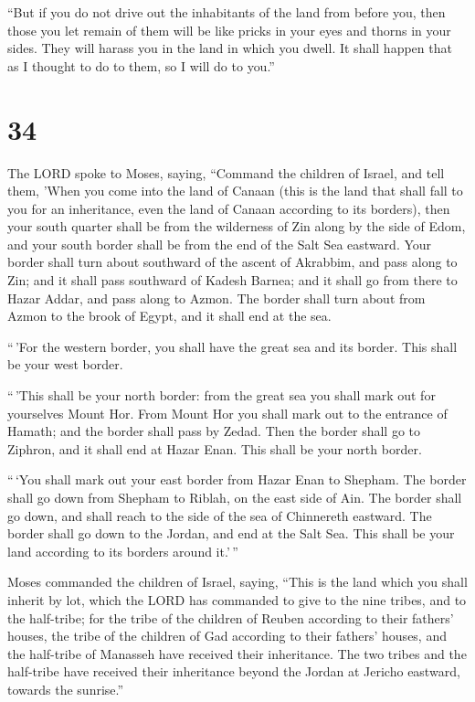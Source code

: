  ``But if you do not drive out the inhabitants of the land
from before you, then those you let remain of them will be like pricks
in your eyes and thorns in your sides. They will harass you in the land
in which you dwell.  It shall happen that as I thought to
do to them, so I will do to you.''

\hypertarget{section-33}{%
\section{34}\label{section-33}}

 The LORD spoke to Moses, saying,  ``Command the
children of Israel, and tell them, 'When you come into the land of
Canaan (this is the land that shall fall to you for an inheritance, even
the land of Canaan according to its borders),  then your
south quarter shall be from the wilderness of Zin along by the side of
Edom, and your south border shall be from the end of the Salt Sea
eastward.  Your border shall turn about southward of the
ascent of Akrabbim, and pass along to Zin; and it shall pass southward
of Kadesh Barnea; and it shall go from there to Hazar Addar, and pass
along to Azmon.  The border shall turn about from Azmon to
the brook of Egypt, and it shall end at the sea.

 ``\,'For the western border, you shall have the great sea
and its border. This shall be your west border.

 ``\,'This shall be your north border: from the great sea
you shall mark out for yourselves Mount Hor.  From Mount Hor
you shall mark out to the entrance of Hamath; and the border shall pass
by Zedad.  Then the border shall go to Ziphron, and it shall
end at Hazar Enan. This shall be your north border.

 ``\,`You shall mark out your east border from Hazar Enan
to Shepham.  The border shall go down from Shepham to
Riblah, on the east side of Ain. The border shall go down, and shall
reach to the side of the sea of Chinnereth eastward.  The
border shall go down to the Jordan, and end at the Salt Sea. This shall
be your land according to its borders around it.'\,''

 Moses commanded the children of Israel, saying, ``This is
the land which you shall inherit by lot, which the LORD has commanded to
give to the nine tribes, and to the half-tribe;  for the
tribe of the children of Reuben according to their fathers' houses, the
tribe of the children of Gad according to their fathers' houses, and the
half-tribe of Manasseh have received their inheritance. 
The two tribes and the half-tribe have received their inheritance beyond
the Jordan at Jericho eastward, towards the sunrise.''

